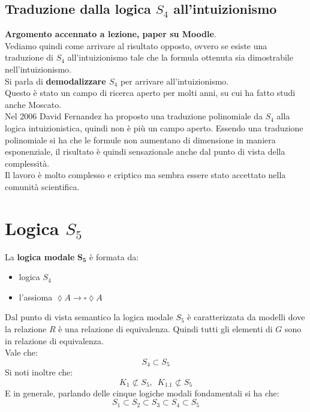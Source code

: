 \documentclass[a4paper,12pt, oneside]{book}
\begin{document}
\subsection{Traduzione dalla logica $S_4$ all'intuizionismo}
\textbf{Argomento accennato a lezione, paper su Moodle}.\\
Vediamo quindi come arrivare al risultato opposto, ovvero se esiste una
traduzione di $S_4$ all'intuizionismo tale che la formula ottenuta sia
dimostrabile nell'intuizionismo.\\
Si parla di \textbf{demodalizzare $S_4$} per arrivare all'intuizionismo.\\
Questo è stato un campo di ricerca aperto per molti anni, su cui ha fatto studi
anche Moscato.\\
Nel 2006 David Fernandez ha proposto una traduzione polinomiale da $S_4$ alla
logica intuizionistica, quindi non è più un campo aperto. Essendo una
traduzione polinomiale si ha che le formule non aumentano di dimensione in
maniera 
esponenziale, il risultato è quindi sensazionale anche dal punto di vista della
complessità.\\ 
Il lavoro è molto complesso e criptico ma sembra essere stato accettato nella
comunità scientifica.
\section{Logica $S_5$}
La \textbf{logica modale} $\mathbf{S_5}$ è formata da:
\begin{itemize}
  \item logica $S_4$
  \item l'assioma $\lozenge A\to \square\lozenge A$
\end{itemize}
Dal punto di vista semantico la logica modale $S_5$ è caratterizzata da modelli
dove la relazione $R$ è una relazione di equivalenza. Quindi tutti gli elementi
di $G$ sono in relazione di equivalenza.\\
Vale che:
\[S_4\subset S_5\]
Si noti inoltre che:
\[K_1\not\subset S_5,\,\,\,K_{1.1}\not\subset S_5\]
E in generale, parlando delle cinque logiche modali fondamentali si ha che:
\[S_1\subset S_2\subset S_3\subset S_4\subset S_5\]
\end{document}

